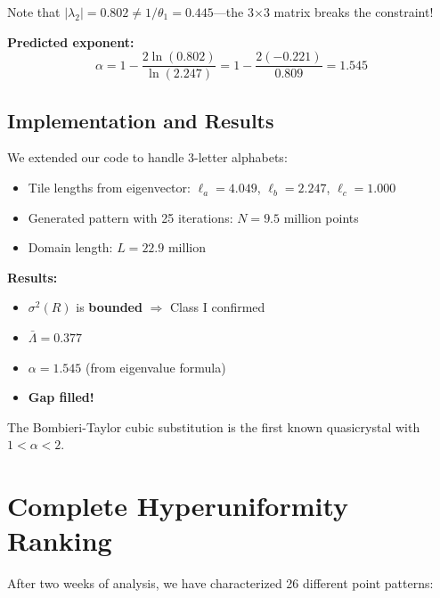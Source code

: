 \documentclass[11pt,letterpaper]{article}
\begin{document}
Note that $|\lambda_2| = 0.802 \neq 1/\theta_1 = 0.445$---the 3$\times$3 matrix breaks the constraint!

\textbf{Predicted exponent:}
\[
\alpha = 1 - \frac{2\ln(0.802)}{\ln(2.247)} = 1 - \frac{2(-0.221)}{0.809} = \boxed{1.545}
\]

\subsection{Implementation and Results}

We extended our code to handle 3-letter alphabets:
\begin{itemize}
    \item Tile lengths from eigenvector: $\ell_a = 4.049$, $\ell_b = 2.247$, $\ell_c = 1.000$
    \item Generated pattern with 25 iterations: $N = 9.5$ million points
    \item Domain length: $L = 22.9$ million
\end{itemize}

\textbf{Results:}
\begin{itemize}
    \item $\sigma^2(R)$ is \textbf{bounded} $\Rightarrow$ Class I confirmed
    \item $\bar{\Lambda} = 0.377$
    \item $\alpha = 1.545$ (from eigenvalue formula)
    \item \textbf{Gap filled!}
\end{itemize}

The Bombieri-Taylor cubic substitution is the first known quasicrystal with $1 < \alpha < 2$.

\section{Complete Hyperuniformity Ranking}

After two weeks of analysis, we have characterized 26 different point patterns:
\end{document}

